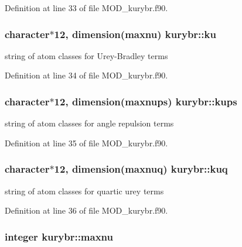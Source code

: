 Definition at line 33 of file M\-O\-D\-\_\-kurybr.\-f90.

\hypertarget{classkurybr_aaa5a733bacfbc38d5ca68d0064489972}{
\subsubsection[{ku}]{\setlength{\rightskip}{0pt plus 5cm}character$\ast$12, dimension({\bf maxnu}) kurybr\-::ku}}\label{classkurybr_aaa5a733bacfbc38d5ca68d0064489972}


string of atom classes for Urey-\/\-Bradley terms 



Definition at line 34 of file M\-O\-D\-\_\-kurybr.\-f90.

\hypertarget{classkurybr_a457e33eaa69a2a95cfeeb92376337664}{
\subsubsection[{kups}]{\setlength{\rightskip}{0pt plus 5cm}character$\ast$12, dimension({\bf maxnups}) kurybr\-::kups}}\label{classkurybr_a457e33eaa69a2a95cfeeb92376337664}


string of atom classes for angle repulsion terms 



Definition at line 35 of file M\-O\-D\-\_\-kurybr.\-f90.

\hypertarget{classkurybr_ac999bd33462bae0efb881aa11f53abee}{
\subsubsection[{kuq}]{\setlength{\rightskip}{0pt plus 5cm}character$\ast$12, dimension({\bf maxnuq}) kurybr\-::kuq}}\label{classkurybr_ac999bd33462bae0efb881aa11f53abee}


string of atom classes for quartic urey terms 



Definition at line 36 of file M\-O\-D\-\_\-kurybr.\-f90.

\hypertarget{classkurybr_aaf30bd9a13addd363c837108f12933ca}{
\subsubsection[{maxnu}]{\setlength{\rightskip}{0pt plus 5cm}integer kurybr\-::maxnu}}\label{classkurybr_aaf30bd9a13addd363c837108f12933ca}



